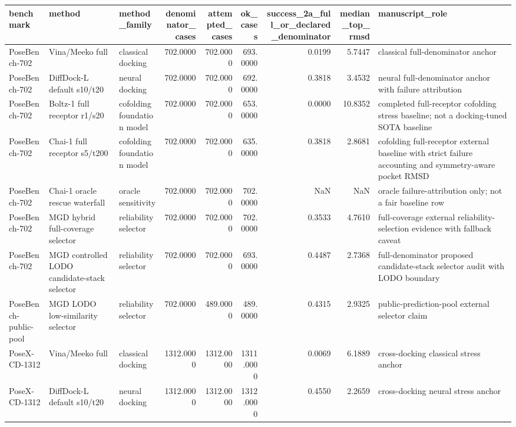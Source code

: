 \begin{tabular}{lllrrrrrl}
\toprule
benchmark & method & method\_family & denominator\_cases & attempted\_cases & ok\_cases & success\_2a\_full\_or\_declared\_denominator & median\_top\_rmsd & manuscript\_role \\
\midrule
PoseBench-702 & Vina/Meeko full & classical docking & 702.0000 & 702.0000 & 693.0000 & 0.0199 & 5.7447 & classical full-denominator anchor \\
PoseBench-702 & DiffDock-L default s10/t20 & neural docking & 702.0000 & 702.0000 & 692.0000 & 0.3818 & 3.4532 & neural full-denominator anchor with failure attribution \\
PoseBench-702 & Boltz-1 full receptor r1/s20 & cofolding foundation model & 702.0000 & 702.0000 & 653.0000 & 0.0000 & 10.8352 & completed full-receptor cofolding stress baseline; not a docking-tuned SOTA baseline \\
PoseBench-702 & Chai-1 full receptor s5/t200 & cofolding foundation model & 702.0000 & 702.0000 & 635.0000 & 0.3818 & 2.8681 & cofolding full-receptor external baseline with strict failure accounting and symmetry-aware pocket RMSD \\
PoseBench-702 & Chai-1 oracle rescue waterfall & oracle sensitivity & 702.0000 & 702.0000 & 702.0000 & NaN & NaN & oracle failure-attribution only; not a fair baseline row \\
PoseBench-702 & MGD hybrid full-coverage selector & reliability selector & 702.0000 & 702.0000 & 702.0000 & 0.3533 & 4.7610 & full-coverage external reliability-selection evidence with fallback caveat \\
PoseBench-702 & MGD controlled LODO candidate-stack selector & reliability selector & 702.0000 & 702.0000 & 693.0000 & 0.4487 & 2.7368 & full-denominator proposed candidate-stack selector audit with LODO boundary \\
PoseBench-public-pool & MGD LODO low-similarity selector & reliability selector & 702.0000 & 489.0000 & 489.0000 & 0.4315 & 2.9325 & public-prediction-pool external selector claim \\
PoseX-CD-1312 & Vina/Meeko full & classical docking & 1312.0000 & 1312.0000 & 1311.0000 & 0.0069 & 6.1889 & cross-docking classical stress anchor \\
PoseX-CD-1312 & DiffDock-L default s10/t20 & neural docking & 1312.0000 & 1312.0000 & 1312.0000 & 0.4550 & 2.2659 & cross-docking neural stress anchor \\
\bottomrule
\end{tabular}
